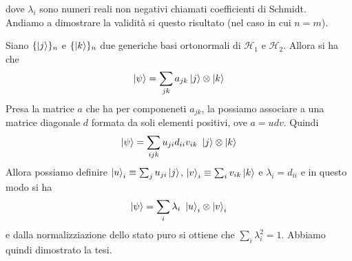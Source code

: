 dove $\lambda_i$ sono numeri reali non negativi chiamati coefficienti di Schmidt.\\

Andiamo a dimostrare la validità si questo risultato (nel caso in cui $n = m$). 

Siano $\{ \ket{j} \}_n$ e $\{ \ket{k} \}_n$ due generiche basi ortonormali di $\mathcal{H}_1$ e $\mathcal{H}_2$. Allora si ha che 
%
\begin{equation*}
    \ket{\psi} = \sum_{jk} a_{jk} \ket{j} \otimes \ket{k}
\end{equation*}
Presa la matrice $a$ che ha per componeneti $a_{jk}$, la possiamo associare a una matrice diagonale $d$ formata da soli elementi positivi, ove $a = udv$. Quindi
%
\begin{equation*}
    \ket{\psi} = \sum_{ijk} u_{ji} d_{ii} v_{ik} \ \ket{j} \otimes \ket{k}
\end{equation*}
Allora possiamo definire $\ket{u}_i \equiv \sum_j u_{ji} \ket{j}$, $\ket{v}_i \equiv \sum_i v_{ik} \ket{k}$ e $\lambda_i = d_{ii}$ e in questo modo si ha 
\begin{equation*}
    \ket{\psi} = \sum_i \lambda_i \ \ket{u}_i \otimes \ket{v}_i
\end{equation*}
e dalla normalizziazione dello stato puro si ottiene che $\sum_i \lambda_i^2 = 1$. Abbiamo quindi dimostrato la tesi. 